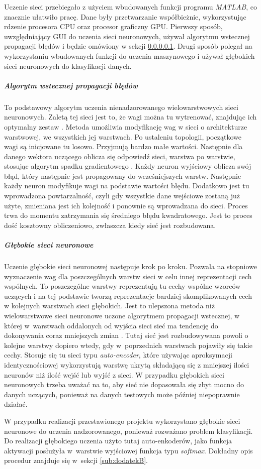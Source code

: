Uczenie sieci przebiegało z użyciem wbudowanych funkcji programu \textit{MATLAB}, co znacznie ułatwiło pracę. Dane były przetwarzanie współbieżnie, wykorzystując rdzenie procesora CPU oraz procesor graficzny GPU. Pierwszy sposób, uwzględniający GUI do uczenia sieci neuronowych, używał algorytmu wstecznej propagacji błędów i będzie omówiony w sekcji \ref{sub:wstecz}. Drugi sposób polegał na wykorzystaniu wbudowanych funkcji do uczenia maszynowego i używał głębokich sieci neuronowych do klasyfikacji danych. 

\subparagraph{Algorytm wstecznej propagacji błędów}
\label{sub:wstecz}

To podstawowy algorytm uczenia nienadzorowanego wielowarstwowych sieci neuronowych. Zaletą tej sieci jest to, że wagi można tu wytrenować, znajdując ich optymalny zestaw \cite{back}. Metoda umożliwia modyfikację wag w sieci o architekturze warstwowej, we wszystkich jej warstwach. Po ustaleniu topologii, początkowe wagi są inicjowane tu losowo. Przyjmują bardzo małe wartości. Następnie dla danego wektora uczącego oblicza się odpowiedź sieci, warstwa po warstwie, stosując algorytm spadku gradientowego \cite{back2}. Każdy neuron wyjściowy oblicza swój błąd, który następnie jest propagowany do wcześniejszych warstw. Następnie każdy neuron modyfikuje wagi na podstawie wartości błędu. Dodatkowo jest tu wprowadzona powtarzalność, czyli gdy wszystkie dane wejściowe zostaną już użyte, zmieniana jest ich kolejność i ponownie są wprowadzana do sieci. Proces trwa do momentu zatrzymania się średniego błędu kwadratowego. Jest to proces dość kosztowny obliczeniowo, zwłaszcza kiedy sieć jest rozbudowana.

\subparagraph{Głębokie sieci neuronowe}
\label{sub:glebokie}

Uczenie głębokie sieci neuronowej następuje krok po kroku. Pozwala na stopniowe wyznaczenie wag dla poszczególnych warstw sieci w celu innej reprezentacji cech wspólnych. To poszczególne warstwy reprezentują tu cechy wspólne wzorców uczących i na tej podstawie tworzą reprezentacje bardziej skomplikowanych cech w kolejnych warstwach sieci głębokich. Jest to ulepszona metoda niż wielowarstwowe sieci neuronowe uczone algorytmem propagacji wstecznej, w której w~warstwach oddalonych od wyjścia sieci sieć ma tendencję do dokonywania coraz mniejszych zmian \cite{deep}. Tutaj sieć jest rozbudowywana powoli o kolejne warstwy dopiero wtedy, gdy w~poprzednich warstwach pojawiły się takie cechy. Stosuje się tu sieci typu \textit{auto-encoder}, które używając aproksymacji identycznościowej wykorzystują warstwę ukrytą składającą się z mniejszej ilości neuronów niż ilość wejść lub wyjść z sieci. W przypadku głębokich sieci neuronowych trzeba uważać na to, aby sieć nie dopasowała się zbyt mocno do danych uczących, ponieważ na danych testowych może później niepoprawnie działać.

W przypadku realizacji przestawionego projektu wykorzystano głębokie sieci neuronowe do uczenia nadzorowanego, ponieważ rozważano problem klasyfikacji. Do realizacji głębokiego uczenia użyto tutaj auto-enkoderów, jako funkcja aktywacji posłużyła w~warstwie wyjściowej funkcja typu \textit{softmax}. Dokładny opis procedur znajduje się w~sekcji \ref{sub:dodatekB}.

